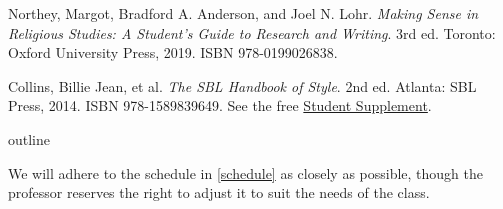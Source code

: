 \documentclass[titlepage]{article}
\begin{document}
\begingroup
\renewcommand{\section}[2]{}%
\begin{thebibliography}{Making Sense}%

	 Northey, Margot, Bradford A. Anderson, and Joel N. Lohr.
	\emph{Making Sense in Religious Studies: A Student's Guide to Research and Writing}.
	3rd ed. Toronto: Oxford University Press, 2019. ISBN 978-0199026838.

	 Collins, Billie Jean, et al.
	\emph{The SBL Handbook of Style}.
	2nd ed. Atlanta: SBL Press, 2014. ISBN 978-1589839649. See the free
	\href{https://www.sbl-site.org/assets/pdfs/pubs/SBLHSsupp2015-02.pdf}{Student Supplement}.

\end{thebibliography}
\endgroup

\section{Course Outline}
\label{outline}

We will adhere to the schedule in \autoref{schedule} as closely as
possible, though the professor reserves the right to adjust it to suit
the needs of the class.
\end{document}
